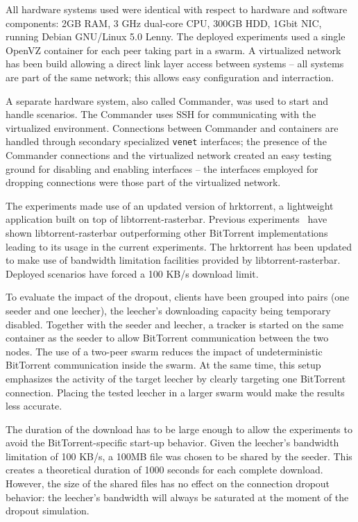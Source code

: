 All hardware systems used were identical with respect to hardware and software
components: 2GB RAM, 3 GHz dual-core CPU, 300GB HDD, 1Gbit NIC, running Debian
GNU/Linux 5.0 Lenny. The deployed experiments used a single OpenVZ container
for each peer taking part in a swarm. A virtualized network has been build
allowing a direct link layer access between systems -- all systems are part of
the same network; this allows easy configuration and interraction.

A separate hardware system, also called Commander, was used to start and
handle scenarios. The Commander uses SSH for communicating with the
virtualized environment. Connections between Commander and containers are
handled through secondary specialized \texttt{venet} interfaces; the presence
of the Commander connections and the virtualized network created an easy
testing ground for disabling and enabling interfaces -- the interfaces
employed for dropping connections were those part of the virtualized network.

The experiments made use of an updated version of hrktorrent, a lightweight
application built on top of libtorrent-rasterbar. Previous
experiments~\cite{bt-vi} have shown libtorrent-rasterbar outperforming other
BitTorrent implementations leading to its usage in the current experiments.
The hrktorrent has been updated to make use of bandwidth limitation facilities
provided by libtorrent-rasterbar.  Deployed scenarios have forced a 100 KB/s
download limit.

To evaluate the impact of the dropout, clients have been grouped into pairs
(one seeder and one leecher), the leecher's downloading capacity being
temporary disabled. Together with the seeder and leecher, a tracker is started
on the same container as the seeder to allow BitTorrent communication between
the two nodes. The use of a two-peer swarm reduces the impact of
undeterministic BitTorrent communication inside the swarm. At the same time,
this setup emphasizes the activity of the target leecher by clearly targeting
one BitTorrent connection. Placing the tested leecher in a larger swarm would
make the results less accurate.

The duration of the download has to be large enough to allow the experiments
to avoid the BitTorrent-specific start-up behavior. Given the leecher's
bandwidth limitation of 100 KB/s, a 100MB file was chosen to be shared by the
seeder. This creates a theoretical duration of 1000 seconds for each complete
download. However, the size of the shared files has no effect on the
connection dropout behavior: the leecher's bandwidth will always be saturated
at the moment of the dropout simulation.

